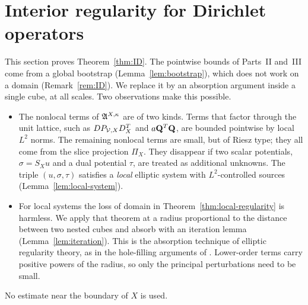 \section{Interior regularity for Dirichlet operators}\label{sec:interior}

This section proves Theorem~\ref{thm:ID}. The pointwise bounds of Parts~II and~III come from a global bootstrap (Lemma~\ref{lem:bootstrap}), which does not work on a domain (Remark~\ref{rem:ID}). We replace it by an absorption argument inside a single cube, at all scales. Two observations make this possible.
\begin{itemize}
\item The nonlocal terms of $\mathfrak A^{X,\kappa}$ are of two kinds. Terms that factor through the unit lattice, such as $DP_{\mathcal V,X}D^T_X$ and $a\mathbf Q^T\mathbf Q$, are bounded pointwise by local $L^2$ norms. The remaining nonlocal terms are small, but of Riesz type; they all come from the slice projection $\Pi_X$. They disappear if two scalar potentials, $\sigma=S_Xu$ and a dual potential $\tau$, are treated as additional unknowns. The triple $(u,\sigma,\tau)$ satisfies a \emph{local} elliptic system with $L^2$-controlled sources (Lemma~\ref{lem:local-system}).
\item For local systems the loss of domain in Theorem~\ref{thm:local-regularity} is harmless. We apply that theorem at a radius proportional to the distance between two nested cubes and absorb with an iteration lemma (Lemma~\ref{lem:iteration}). This is the absorption technique of elliptic regularity theory, as in the hole-filling arguments of \cite[Ch.~V]{Giaquinta}. Lower-order terms carry positive powers of the radius, so only the principal perturbations need to be small.
\end{itemize}
No estimate near the boundary of $X$ is used.

